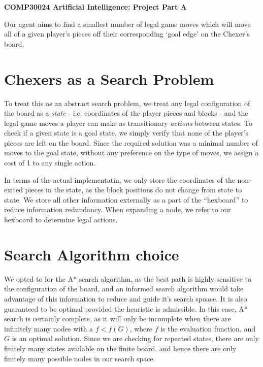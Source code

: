 \documentclass{article}[11pt]
\theoremstyle{plain}
\theoremstyle{definition}
\newcommand{\gap}{\vspace{11pt}}
\begin{document}
{ \Large\textbf{\centering COMP30024 Artificial Intelligence: Project Part A}}

\gap

Our agent aims to find a smallest number of legal game moves which will move all of a given player's pieces off their corresponding `goal edge' on the Chexer's board.

\section{Chexers as a Search Problem}

To treat this as an abstract search problem, we treat any legal configuration of the board as a \textit{state} - i.e. coordinates of the player pieces and blocks - and the legal game moves a player can make as transitionary \textit{actions} between states. To check if a given state is a goal state, we simply verify that none of the player's pieces are left on the board. Since the required solution was a minimal number of moves to the goal state, without any preference on the type of moves, we assign a cost of 1 to any single action.

In terms of the actual implementatin, we only store the coordinates of the non-exited pieces in the state, as the block positions do not change from state to state. We store all other information externally as a part of the ``hexboard'' to reduce information redundancy. When expanding a node, we refer to our hexboard to determine legal actions.

\section{Search Algorithm choice}

We opted to for the A* search algorithm, as the best path is highly sensitive to the configuration of the board, and an informed search algorithm would take advantage of this information to reduce and guide it's search spoace. It is also guaranteed to be optimal provided the heuristic is admissible. In this case, A* search is certainly complete, as it will only be incomplete when there are infinitely many nodes with a $f<f(G)$, where $f$ is the evaluation function, and $G$ is an optimal solution. Since we are checking for repeated states, there are only finitely many states available on the finite board, and hence there are only finitely many possible nodes in our search space.
\end{document}
